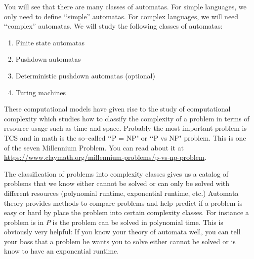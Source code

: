 You will see that there are many classes of automatas.
For simple languages, we only need to define \lq\lq simple'' automatas.
For complex languages, we will need \lq\lq complex'' automatas.
We will study the following classes of automatas:
\begin{enumerate}
\item Finite state automatas 
\item Pushdown automatas
\item Deterministic pushdown automatas (optional)
\item Turing machines
\end{enumerate}

These computational models have given rise to
the study of computational complexity 
which studies how to classify the complexity of a problem
in terms of resource usage such as time and space.
Probably the most important problem is TCS and in math
is the so--called \lq\lq P = NP" or \lq\lq P vs NP" problem.
This is one of the seven Millennium Problem.
You can read about it at
\url{https://www.claymath.org/millennium-problems/p-vs-np-problem}.

The classification of problems into complexity classes
gives us a catalog of problems that we know either cannot be solved
or can only be solved with different resources (polynomial
runtime, exponential runtime, etc.)
Automata theory provides methods to compare problems and
help predict if a problem is easy or hard by place the problem
into certain complexity classes.
For instance a problem is in $P$ is the problem can be solved in
polynomial time.
This is obviously very helpful:
If you know your theory of automata well, you can tell your boss
that a problem he wants you to solve either cannot be solved or
is know to have an exponential runtime.
